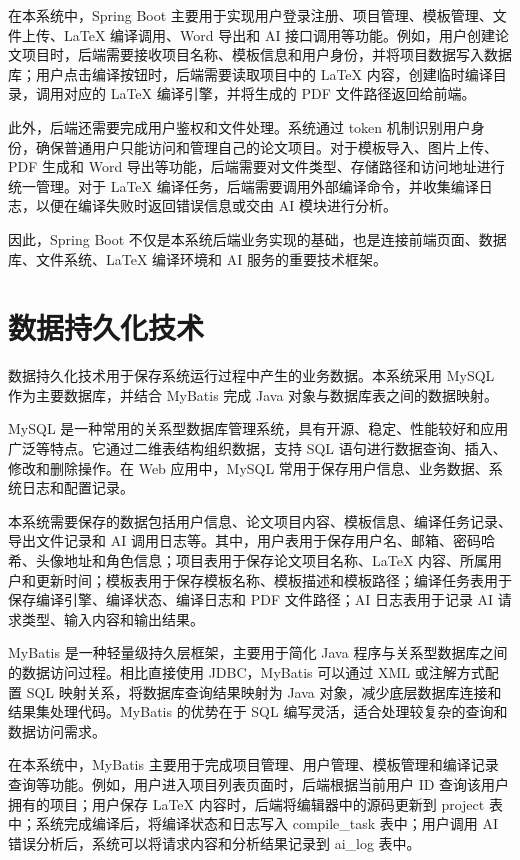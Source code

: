 \documentclass{xduugthesis}
\begin{document}
在本系统中，Spring Boot 主要用于实现用户登录注册、项目管理、模板管理、文件上传、LaTeX 编译调用、Word 导出和 AI 接口调用等功能。例如，用户创建论文项目时，后端需要接收项目名称、模板信息和用户身份，并将项目数据写入数据库；用户点击编译按钮时，后端需要读取项目中的 LaTeX 内容，创建临时编译目录，调用对应的 LaTeX 编译引擎，并将生成的 PDF 文件路径返回给前端。

此外，后端还需要完成用户鉴权和文件处理。系统通过 token 机制识别用户身份，确保普通用户只能访问和管理自己的论文项目。对于模板导入、图片上传、PDF 生成和 Word 导出等功能，后端需要对文件类型、存储路径和访问地址进行统一管理。对于 LaTeX 编译任务，后端需要调用外部编译命令，并收集编译日志，以便在编译失败时返回错误信息或交由 AI 模块进行分析。

因此，Spring Boot 不仅是本系统后端业务实现的基础，也是连接前端页面、数据库、文件系统、LaTeX 编译环境和 AI 服务的重要技术框架。

\section{数据持久化技术}
数据持久化技术用于保存系统运行过程中产生的业务数据。本系统采用 MySQL 作为主要数据库，并结合 MyBatis 完成 Java 对象与数据库表之间的数据映射。

MySQL 是一种常用的关系型数据库管理系统，具有开源、稳定、性能较好和应用广泛等特点\cite{botros2021mysql}。它通过二维表结构组织数据，支持 SQL 语句进行数据查询、插入、修改和删除操作。在 Web 应用中，MySQL 常用于保存用户信息、业务数据、系统日志和配置记录。

本系统需要保存的数据包括用户信息、论文项目内容、模板信息、编译任务记录、导出文件记录和 AI 调用日志等。其中，用户表用于保存用户名、邮箱、密码哈希、头像地址和角色信息；项目表用于保存论文项目名称、LaTeX 内容、所属用户和更新时间；模板表用于保存模板名称、模板描述和模板路径；编译任务表用于保存编译引擎、编译状态、编译日志和 PDF 文件路径；AI 日志表用于记录 AI 请求类型、输入内容和输出结果。

MyBatis 是一种轻量级持久层框架，主要用于简化 Java 程序与关系型数据库之间的数据访问过程\cite{reddy2013mybatis}。相比直接使用 JDBC，MyBatis 可以通过 XML 或注解方式配置 SQL 映射关系，将数据库查询结果映射为 Java 对象，减少底层数据库连接和结果集处理代码。MyBatis 的优势在于 SQL 编写灵活，适合处理较复杂的查询和数据访问需求。

在本系统中，MyBatis 主要用于完成项目管理、用户管理、模板管理和编译记录查询等功能。例如，用户进入项目列表页面时，后端根据当前用户 ID 查询该用户拥有的项目；用户保存 LaTeX 内容时，后端将编辑器中的源码更新到 project 表中；系统完成编译后，将编译状态和日志写入 compile\_task 表中；用户调用 AI 错误分析后，系统可以将请求内容和分析结果记录到 ai\_log 表中。
\end{document}
